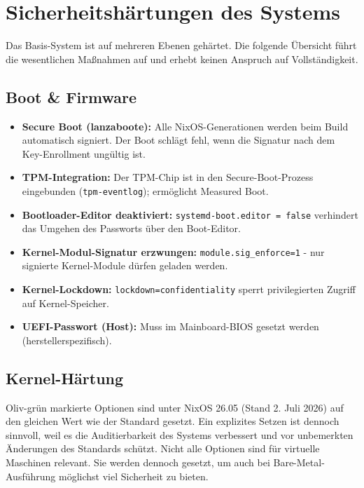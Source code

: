 \section{Sicherheitshärtungen des Systems}
\label{sec:hardening}
Das Basis-System ist auf mehreren Ebenen gehärtet. Die folgende Übersicht
führt die wesentlichen Maßnahmen auf und erhebt keinen Anspruch auf
Vollständigkeit.

\subsection{Boot \& Firmware}
\begin{itemize}
  \item \textbf{Secure Boot (lanzaboote):} Alle NixOS-Generationen werden beim Build automatisch signiert. Der Boot schlägt fehl, wenn die Signatur nach dem Key-Enrollment ungültig ist.
  \item \textbf{\acs{TPM}-Integration:} Der \ac{TPM}-Chip ist in den Secure-Boot-Prozess eingebunden (\texttt{tpm-eventlog}); ermöglicht Measured Boot.
  \item \textbf{Bootloader-Editor deaktiviert:} \texttt{systemd-boot.editor = false} verhindert das Umgehen des Passworts über den Boot-Editor.
  \item \textbf{Kernel-Modul-Signatur erzwungen:} \texttt{module.sig\_enforce=1} - nur signierte Kernel-Module dürfen geladen werden.
  \item \textbf{Kernel-Lockdown:} \texttt{lockdown=confidentiality} sperrt privilegierten Zugriff auf Kernel-Speicher.
  \item \textbf{\acs{UEFI}-Passwort (Host):} Muss im Mainboard-\ac{BIOS} gesetzt werden (herstellerspezifisch).
\end{itemize}

\subsection{Kernel-Härtung}
\textcolor{OliveGreen}{Oliv-grün} markierte Optionen sind unter NixOS 26.05
(Stand 2. Juli 2026) auf den gleichen Wert wie der Standard gesetzt. Ein
explizites Setzen ist dennoch sinnvoll, weil es die Auditierbarkeit des
Systems verbessert und vor unbemerkten Änderungen des Standards schützt.
Nicht alle Optionen sind für virtuelle Maschinen relevant. Sie werden dennoch
gesetzt, um auch bei Bare-Metal-Ausführung möglichst viel Sicherheit zu
bieten.

